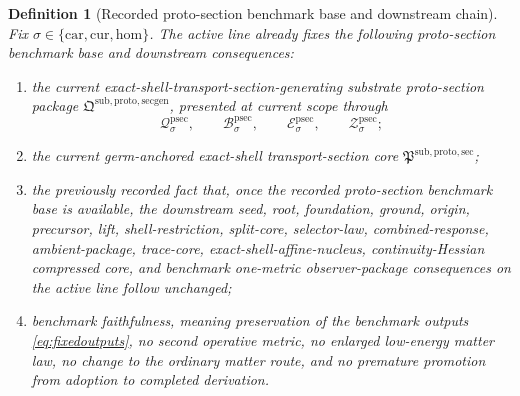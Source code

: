 \documentclass[11pt]{article}
\newcommand{\Car}{\mathrm{car}}
\newcommand{\Cur}{\mathrm{cur}}
\newcommand{\Hom}{\mathrm{hom}}
\newcommand{\ProtoSectionCore}{\mathfrak P^{\mathrm{sub,proto,sec}}}
\newcommand{\ProtoSectionPackage}{\mathfrak Q^{\mathrm{sub,proto,secgen}}}
\newcommand{\ProtoSectionState}[1]{\mathcal Q_{#1}^{\mathrm{psec}}}
\newcommand{\ProtoSectionBody}[1]{\mathcal B_{#1}^{\mathrm{psec}}}
\newcommand{\ProtoSectionFunctional}[1]{\mathscr E_{#1}^{\mathrm{psec}}}
\newcommand{\ProtoSectionShell}[1]{\mathcal Z_{#1}^{\mathrm{psec}}}
\newtheorem{definition}{Definition}
\begin{document}
\begin{definition}[Recorded proto-section benchmark base and downstream chain]
\label{def:downstream}
Fix \(\sigma\in\{\Car,\Cur,\Hom\}\). The active line already fixes the following proto-section benchmark base and downstream consequences:
\begin{enumerate}
    \item the current exact-shell-transport-section-generating substrate proto-section package \(\ProtoSectionPackage\), presented at current scope through
    \[
    \ProtoSectionState{\sigma},\qquad
    \ProtoSectionBody{\sigma},\qquad
    \ProtoSectionFunctional{\sigma},\qquad
    \ProtoSectionShell{\sigma};
    \]
    \item the current germ-anchored exact-shell transport-section core \(\ProtoSectionCore\);
    \item the previously recorded fact that, once the recorded proto-section benchmark base is available, the downstream seed, root, foundation, ground, origin, precursor, lift, shell-restriction, split-core, selector-law, combined-response, ambient-package, trace-core, exact-shell-affine-nucleus, continuity-Hessian compressed core, and benchmark one-metric observer-package consequences on the active line follow unchanged;
    \item benchmark faithfulness, meaning preservation of the benchmark outputs \eqref{eq:fixedoutputs}, no second operative metric, no enlarged low-energy matter law, no change to the ordinary matter route, and no premature promotion from adoption to completed derivation.
\end{enumerate}
\end{definition}
\end{document}
